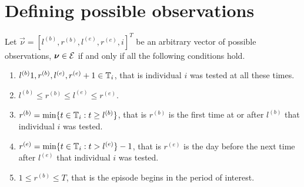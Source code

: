 \documentclass[thesis.tex]{subfiles}
\begin{document}
\chapter{Defining possible observations} \label{perf-test:sec:conditions-nu-E}

Let $\vec{\nu} = [l^{(b)}, r^{(b)}, l^{(e)}, r^{(e)}, i]^T$ be an arbitrary vector of possible observations, $\bm{\nu} \in \mathcal{E}$ if and only if all the following conditions hold.
\begin{enumerate}
  \item $l^{(b)} 1, r^{(b)}, l^{(e)}, r^{(e)} + 1 \in \mathbb{T}_{i}$, that is individual ${i}$ was tested at all these times.
  \item $l^{(b)} \leq r^{(b)} \leq l^{(e)} \leq r^{(e)}$.
  \item $r^{(b)} = \min\{t \in \mathbb{T}_{i} : t \geq l^{(b)}\}$, that is $r^{(b)}$ is the first time at or after $l^{(b)}$ that individual ${i}$ was tested.
  \item $r^{(e)} = \min\{t \in \mathbb{T}_{i} : t > l^{(e)}\} - 1$, that is $r^{(e)}$ is the day before the next time after $l^{(e)}$ that individual ${i}$ was tested.
  \item $1 \leq r^{(b)} \leq T$, that is the episode begins in the period of interest.
\end{enumerate}
\end{document}
